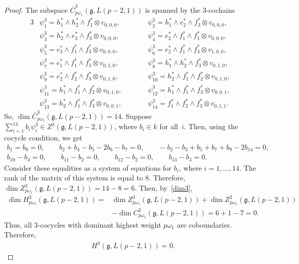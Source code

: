 \documentclass[pdftex]{sigma}%
\numberwithin{equation}{section}
\begin{document}
\begin{proof}
The subspace $\overline{C}^3_{p\omega_1}(\mathfrak{g},L(p-2,1))$ is spanned by the $3$-cochains
\begin{alignat*}{3}
&\psi_1^3=h_1^*\wedge h_2^*\wedge f_1^*\otimes v_{0,0,0},\qquad&&
\psi_2^3=h_1^*\wedge e_2^*\wedge f_3^*\otimes v_{0,0,0},&
\\
&\psi_3^3=h_2^*\wedge e_2^*\wedge f_3^*\otimes v_{0,0,0},\qquad&&
\psi_4^3=e_2^*\wedge f_1^*\wedge f_1^*\otimes v_{0,0,0},&
\\
&\psi_5^3=e_3^*\wedge f_1^*\wedge f_3^*\otimes v_{0,0,0},\qquad&&
\psi_6^3=e_2^*\wedge f_1^*\wedge f_3^*\otimes v_{1,0,0},&
\\
&\psi_7^3=e_1^*\wedge f_1^*\wedge f_3^*\otimes v_{0,1,0},\qquad&&
\psi_8^3=h_1^*\wedge h_2^*\wedge f_3^*\otimes v_{0,1,0},&
\\
&\psi_9^3=e_2^*\wedge f_2^*\wedge f_3^*\otimes v_{0,1,0},\qquad&&
\psi_{10}^3=h_2^*\wedge f_1^*\wedge f_2^*\otimes v_{0,1,0},&
\\
&\psi_{11}^3=h_1^*\wedge f_1^*\wedge f_2^*\otimes v_{0,1,0},\qquad&&
\psi_{12}^3=h_1^*\wedge f_1^*\wedge f_3^*\otimes v_{0,0,1},&
\\
&\psi_{13}^3=h_2^*\wedge f_1^*\wedge f_3^*\otimes v_{0,0,1},\qquad&&
\psi_{14}^3=f_1^*\wedge f_2^*\wedge f_3^*\otimes v_{0,1,1}.&
\end{alignat*}
So, $\dim \overline{C}^3_{p\omega_1}(\mathfrak{g},L(p-2,1))=14$. Suppose $\sum_{i=1}^{14}b_i\psi_i^3\in Z^3(\mathfrak{g},L(p-2,1))$, where $b_i\in k$ for all~$i$. Then, using the cocycle condition, we get
\begin{gather*}
b_1=b_8=0,
\qquad
b_2+b_4-b_5-2b_6-b_7=0,
\qquad
-b_2-b_3+b_5+b_7+b_9-2b_{14}=0,
\\
b_{10}-b_3=0,
\qquad
b_{11}-b_2=0,
\qquad
b_{12}-b_2=0,
\qquad
b_{13}-b_3=0.
\end{gather*}
Consider these equalities as a system of equations for $b_i$, where $i=1,\dots,14$. The rank of the matrix of this system is equal to $8$. Therefore, $\dim Z^3_{p\omega_1}(\mathfrak{g},L(p-2,1))=14-8=6$. Then, by~\eqref{dim3},
\begin{align*}
\dim H^3_{p\omega_1}(\mathfrak{g},L(p-2,1))={}&
\dim Z^3_{p\omega_1}(\mathfrak{g},L(p-2,1))+\dim Z^2_{p\omega_1}(\mathfrak{g},L(p-2,1))
\\
&-\dim C^2_{p\omega_1}(\mathfrak{g},L(p-2,1))=6+1-7=0.
\end{align*}
Thus, all $3$-cocycles with dominant highest weight $p\omega_1$ are coboundaries. Therefore,
\begin{gather*}
H^3(\mathfrak{g},L(p-2,1))=0.
\end{gather*}


\end{proof}
\end{document}
